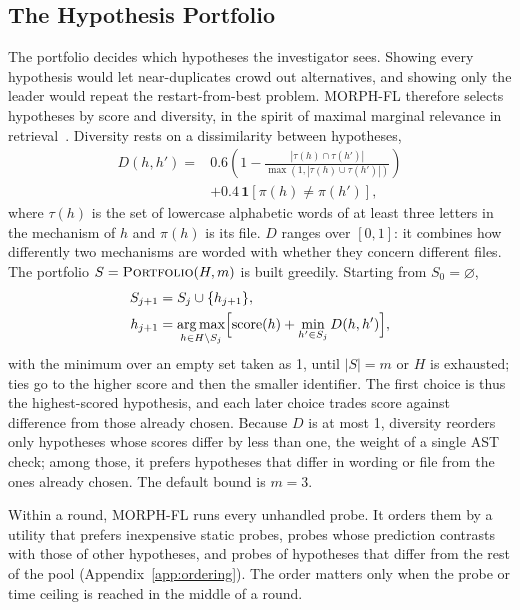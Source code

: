 \documentclass[letterpaper,journal]{IEEEtran}
\newcommand{\tool}{MORPH-FL}
\begin{document}
\subsection{The Hypothesis Portfolio}\label{sec:portfolio}
The portfolio decides which hypotheses the investigator sees. Showing every hypothesis would let near-duplicates crowd out alternatives, and showing only the leader would repeat the restart-from-best problem. \tool{} therefore selects hypotheses by score and diversity, in the spirit of maximal marginal relevance in retrieval~\cite{mmr1998}. Diversity rests on a dissimilarity between hypotheses,
\begin{equation}\label{eq:distance}
\begin{aligned}
D(h,h')={}&0.6\left(1-\frac{|\tau(h)\cap\tau(h')|}{\max(1,|\tau(h)\cup\tau(h')|)}\right)\\
&+0.4\,\mathbf{1}[\pi(h)\neq\pi(h')],
\end{aligned}
\end{equation}
where $\tau(h)$ is the set of lowercase alphabetic words of at least three letters in the mechanism of $h$ and $\pi(h)$ is its file. $D$ ranges over $[0,1]$: it combines how differently two mechanisms are worded with whether they concern different files. The portfolio $S=\textsc{Portfolio}(H,m)$ is built greedily. Starting from $S_0=\varnothing$,
\begin{equation}\label{eq:portfolio}
\begin{aligned}
S_{j+1}&=S_j\cup\{h_{j+1}\},\\
h_{j+1}&=\operatorname*{arg\,max}_{h\in H\setminus S_j}\Bigl[\mathrm{score}(h)+\min_{h'\in S_j}D(h,h')\Bigr],
\end{aligned}
\end{equation}
with the minimum over an empty set taken as 1, until $|S|=m$ or $H$ is exhausted; ties go to the higher score and then the smaller identifier. The first choice is thus the highest-scored hypothesis, and each later choice trades score against difference from those already chosen. Because $D$ is at most 1, diversity reorders only hypotheses whose scores differ by less than one, the weight of a single AST check; among those, it prefers hypotheses that differ in wording or file from the ones already chosen. The default bound is $m=3$.

Within a round, \tool{} runs every unhandled probe. It orders them by a utility that prefers inexpensive static probes, probes whose prediction contrasts with those of other hypotheses, and probes of hypotheses that differ from the rest of the pool (Appendix~\ref{app:ordering}). The order matters only when the probe or time ceiling is reached in the middle of a round.
\end{document}
